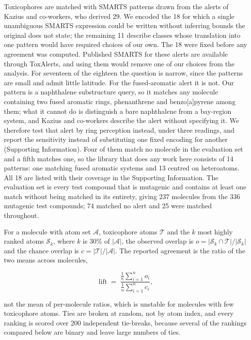 \documentclass[journal=jcisd8,manuscript=article]{achemso}
\begin{document}
Toxicophores are matched with SMARTS patterns drawn from the alerts of Kazius and
co-workers,\cite{kazius2005} who derived 29. We encoded the 18 for which a single
unambiguous SMARTS expression could be written without inferring bounds the original does not
state; the remaining 11 describe classes whose translation into one pattern would have
required choices of our own. The 18 were fixed before any agreement was computed. Published SMARTS for these alerts are
available through ToxAlerts,\cite{sushko2012} and using them would remove one of our choices
from the analysis. For seventeen of the eighteen the question is narrow, since the patterns
are small and admit little latitude. For the fused-aromatic alert it is not. Our pattern is a
naphthalene substructure query, so it matches any molecule containing two fused aromatic
rings, phenanthrene and benzo[a]pyrene among them; what it cannot do is distinguish a bare
naphthalene from a bay-region system, and Kazius and co-workers describe the alert without specifying it. We therefore test that
alert by ring perception instead, under three readings, and report the sensitivity instead of substituting one fixed encoding for another (Supporting Information). Four of
them match no molecule in the evaluation set and a fifth matches one, so the library that
does any work here consists of 14 patterns: one matching fused aromatic systems and 13
centred on heteroatoms. All 18 are listed with their coverage in the Supporting Information. The
evaluation set is every test compound that is mutagenic and contains at least one match
without being matched in its entirety, giving 237 molecules from the 336 mutagenic test
compounds; 74 matched no alert and 25 were matched throughout.

For a molecule with atom set $\mathcal{A}$, toxicophore atoms $\mathcal{T}$ and the $k$ most
highly ranked atoms $\mathcal{S}_k$, where $k$ is 30\% of $|\mathcal{A}|$, the observed
overlap is $o = |\mathcal{S}_k \cap \mathcal{T}| / |\mathcal{S}_k|$ and the chance overlap is
$c = |\mathcal{T}| / |\mathcal{A}|$. The reported agreement is the ratio of the two means
across molecules,

\begin{equation}
\label{eq:lift}
\mathrm{lift} \;=\;
\frac{\frac{1}{n}\sum_{i=1}^{n} o_i}{\frac{1}{n}\sum_{i=1}^{n} c_i},
\end{equation}

not the mean of per-molecule ratios, which is unstable for molecules with few
toxicophore atoms. Ties are broken at random, not by atom index, and every ranking is
scored over 200 independent tie-breaks, because several of the rankings compared below are
binary and leave large numbers of ties.
\end{document}
